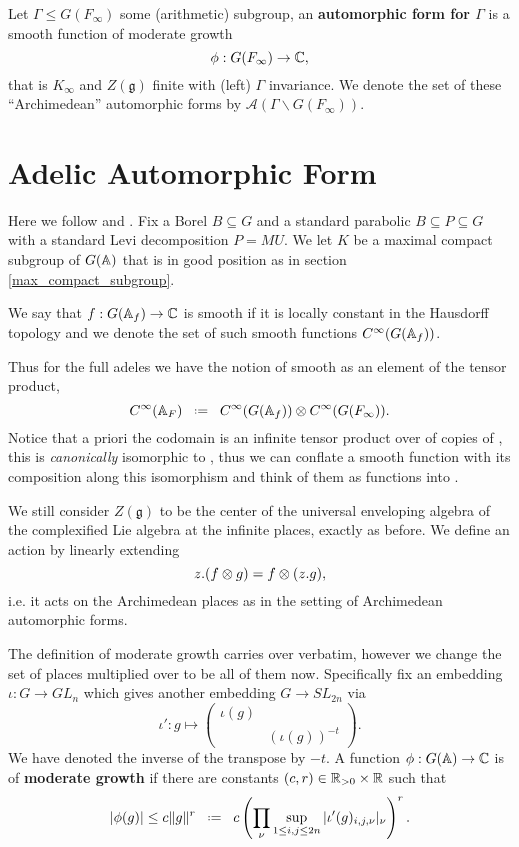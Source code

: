 	\begin{Definition}
		Let \(\Gamma\leq G(F_\infty)\) some (arithmetic) subgroup, an \textbf{automorphic form for \(\Gamma\)} is a smooth function of moderate growth 
		\[\phi: G(F_\infty) \to \C,\]
		that is \(K_\infty\) and \(Z(\mathfrak{g})\) finite with  (left) \(\Gamma\) invariance. We denote the set of these ``Archimedean'' automorphic forms by \(\mathcal{A}(\Gamma \backslash G(F_\infty))\).
	\end{Definition}


\section{Adelic Automorphic Form}
Here we follow \cite[I.2.17]{moeglinSpectralDecompositionEisenstein1995} and \cite[Part 1, ``Automorphic Forms and Automorphic Representations'', 1.2]{borelAutomorphicFormsRepresentations1979}. Fix a Borel \(B\subseteq G\) and a standard parabolic \(B\subseteq P \subseteq G\) with a standard Levi decomposition \(P = MU\). We let \(K\) be a maximal compact subgroup of \(G(\A)\) that is in good position as in section \ref{max_compact_subgroup}.

We say that \(f: G(\A_f) \to \C\) is smooth if it is locally constant in the Hausdorff topology and we denote the set of such smooth functions \(C^\infty(G(\A_f))\).

	Thus for the full adeles we have the notion of smooth as an element of the tensor product,
	\[C^\infty(\mathbb{A}_F) \defeq   C^\infty(G(\mathbb{A}_f))   \otimes   C^\infty(G(F_\infty)).\]
	Notice that a priori the codomain is an infinite tensor product over \C of copies of \C, this is \textit{canonically} isomorphic to \C, thus we can conflate a smooth function with its composition along this isomorphism and think of them as functions into \C.

	We still consider \(Z(\mathfrak{g})\) to be the center of the universal enveloping algebra of the complexified Lie algebra at the infinite places, exactly as before. We define an action by linearly extending
    \[z.(f\otimes g) = f\otimes (z.g),\]
    i.e. it acts on the Archimedean places as in the setting of Archimedean automorphic forms. 
	
	The definition of moderate growth carries over verbatim, however we change the set of places multiplied over to be all of them now. Specifically fix an embedding \(\iota : G\to GL_n\) which gives another embedding \(G\to SL_{2n}\) via
	\[\iota': g\mapsto \begin{pmatrix}
		\iota (g) & \\
		& (\iota (g))^{-t}
	\end{pmatrix}.\]
	We have denoted the inverse of the transpose by \(-t\). A function \(\phi : G(\A) \to \C \) is of \textbf{moderate growth} if there are constants \((c,r)\in \R_{>0}\times \R\) such that 
	\[|\phi(g)| \leq c\norm{g}^r \defeq c \left(\prod_{\nu} \sup_{1\leq i, j\leq 2n} |\iota' (g)_{i,j, \nu}|_\nu\right)^r.\]
    
